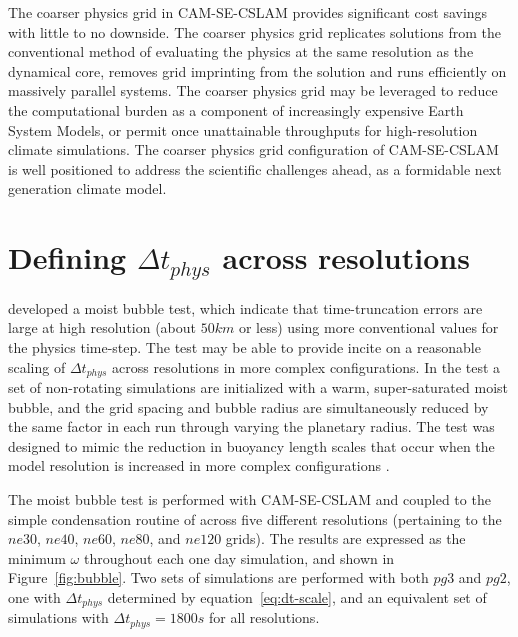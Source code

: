 \documentclass{agujournal}
\begin{document}
The coarser physics grid in CAM-SE-CSLAM provides significant cost savings with little to no downside. The coarser physics grid replicates solutions from the conventional method of evaluating the physics at the same resolution as the dynamical core, removes grid imprinting from the solution and runs efficiently on massively parallel systems. The coarser physics grid may be leveraged to reduce the computational burden as a component of increasingly expensive Earth System Models, or permit once unattainable throughputs for high-resolution climate simulations. The coarser physics grid configuration of CAM-SE-CSLAM is well positioned to address the scientific challenges ahead, as a formidable next generation climate model.




%
%
%
%
\appendix
\section{Defining $\Delta t_{phys}$ across resolutions}\label{sec:app1}
 \cite{HR2018JAMES} developed a moist bubble test, which indicate that time-truncation errors are large at high resolution (about $50km$ or less) using more conventional values for the physics time-step. The test may be able to provide incite on a reasonable scaling of $\Delta t_{phys}$ across resolutions in more complex configurations. In the test a set of non-rotating simulations are initialized with a warm, super-saturated moist bubble, and the grid spacing and bubble radius are simultaneously reduced by the same factor in each run through varying the planetary radius. The test was designed to mimic the reduction in buoyancy length scales that occur when the model resolution is increased in more complex configurations \citep{HETAL2006JCLIM,HR2018JAMES}. 
 
The moist bubble test is performed with CAM-SE-CSLAM and coupled to the simple condensation routine of \cite{K1969MM} across five different resolutions (pertaining to the $ne30$, $ne40$, $ne60$, $ne80$, and $ne120$ grids). The results are expressed as the minimum $\omega$ throughout each one day simulation, and shown in Figure~\ref{fig:bubble}. Two sets of simulations are performed with both $pg3$ and $pg2$, one with $\Delta t_{phys}$ determined by equation~\eqref{eq:dt-scale}, and an equivalent set of simulations with $\Delta t_{phys} = 1800s$ for all resolutions. 
\end{document}
